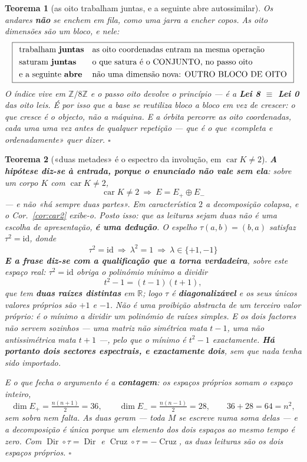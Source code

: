 \documentclass[11pt,a4paper]{article}
\newtheorem{teorema}{Teorema}
\begin{document}
\begin{teorema}[as oito trabalham juntas, e a seguinte abre autossimilar]\label{thm:juntas}
Os andares \textbf{não} se enchem em fila, como uma jarra a encher copos. As oito
dimensões são \emph{um bloco}, e nele:
\[
\boxed{
\begin{array}{ll}
\text{trabalham \textbf{juntas}} & \text{as oito coordenadas entram na mesma operação}\\[3pt]
\text{saturam \textbf{juntas}} & \text{o que satura é o CONJUNTO, no passo oito}\\[3pt]
\text{e a seguinte \textbf{abre}} & \text{não uma dimensão nova: OUTRO BLOCO DE OITO}
\end{array}}
\]
O índice vive em $\mathbb{Z}/8\mathbb{Z}$ e o passo oito devolve o princípio --- é a
\textbf{Lei 8 $\equiv$ Lei 0} das oito leis. É por isso que a base se \emph{reutiliza}
bloco a bloco em vez de crescer: \emph{o que cresce é o objecto, não a máquina}. E a
órbita percorre as oito coordenadas, cada uma uma vez antes de qualquer repetição --- que
é o que «completa e ordenadamente» quer dizer. $\square$
\end{teorema}
\begin{teorema}[«duas metades» é o espectro da involução, em $\operatorname{car}K\neq2$]\label{thm:espectro-tau}
\textbf{A hipótese diz-se à entrada, porque o enunciado não vale sem ela}: sobre um
corpo $K$ com $\operatorname{car}K\neq2$,
\[
\boxed{\;\operatorname{car}K\neq2\ \Longrightarrow\ E=E_{+}\oplus E_{-}\;}
\]
--- e \emph{não} «há sempre duas partes». Em característica $2$ a decomposição colapsa,
e o Cor.~\ref{cor:car2} exibe-o. Posto isso: que as leituras sejam \emph{duas} não é uma
escolha de apresentação, \textbf{é uma dedução}. O espelho $\tau(a,b)=(b,a)$ satisfaz
$\tau^{2}=\mathrm{id}$, donde
\[
\boxed{\;\tau^{2}=\mathrm{id}\ \Longrightarrow\ \lambda^{2}=1\ \Longrightarrow\
\lambda\in\{+1,-1\}\;}
\]
\textbf{E a frase diz-se com a qualificação que a torna verdadeira}, sobre este espaço
real: $\tau^{2}=\mathrm{id}$ obriga o polinómio mínimo a \emph{dividir}
\[
t^{2}-1=(t-1)(t+1),
\]
que tem \textbf{duas raízes distintas} em $\mathbb{R}$; logo $\tau$ é
\textbf{diagonalizável} e os seus únicos valores próprios são $+1$ e $-1$. Não é uma
proibição abstracta de um terceiro valor próprio: é o mínimo a dividir um polinómio de
raízes simples. E os dois factores não servem sozinhos --- uma matriz não simétrica mata
$t-1$, uma não antissimétrica mata $t+1$ ---, pelo que o mínimo é $t^{2}-1$
\emph{exactamente}. \textbf{Há portanto dois sectores espectrais, e exactamente dois},
sem que nada tenha sido importado.

E o que fecha o argumento é a \textbf{contagem}: os espaços próprios somam o espaço
inteiro,
\[
\dim E_{+}=\tfrac{n(n+1)}2=36,\qquad
\dim E_{-}=\tfrac{n(n-1)}2=28,\qquad
36+28=64=n^{2},
\]
sem sobra nem falta. As duas geram --- toda $M$ se escreve numa soma delas --- e a
decomposição é única porque um elemento dos dois espaços ao mesmo tempo é zero. Com
$\operatorname{Dir}\circ\tau=\operatorname{Dir}$ e
$\operatorname{Cruz}\circ\tau=-\operatorname{Cruz}$, as duas leituras \emph{são} os dois
espaços próprios. $\square$
\end{teorema}
\end{document}
